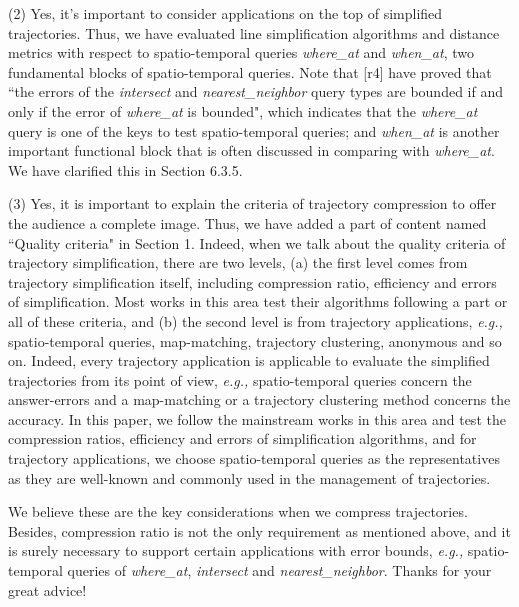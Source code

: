 \documentclass{letter}
\newcommand{\eg}{\emph{e.g.,}\xspace}
\begin{document}
{(2) Yes, it's important to consider applications on the top of simplified trajectories. Thus, we have evaluated line simplification algorithms and distance metrics with respect to spatio-temporal queries \emph{where\_at} and \emph{when\_at}, two fundamental blocks of spatio-temporal queries. Note that [r4] have proved that ``the errors of the \emph{intersect} and \emph{nearest\_neighbor} query types are bounded if and only if the error of \emph{where\_at} is bounded", which indicates that the \emph{where\_at} query is one of the keys to test spatio-temporal queries; and \emph{when\_at} is another important functional block that is often discussed in comparing with \emph{where\_at}.
We have clarified this in Section 6.3.5.

(3) {Yes, it is important to explain the criteria of trajectory compression to offer the audience a complete image.} Thus, we have added a part of content named ``Quality criteria" in Section 1. Indeed, when we talk about the quality criteria of trajectory simplification, there are two levels, 
(a) the first level comes from trajectory simplification itself, including compression ratio, efficiency and errors of simplification. Most works in this area test their algorithms following a part or all of these criteria, and 
(b) the second level is from trajectory applications, \eg spatio-temporal queries, map-matching, trajectory clustering, anonymous and so on. Indeed, every trajectory application is applicable to evaluate the simplified trajectories from its point of view, \eg spatio-temporal queries concern the answer-errors and a map-matching or a trajectory clustering method concerns the accuracy.
%
In this paper, we follow the mainstream works in this area and test the compression ratios, efficiency and errors of simplification algorithms, and for trajectory applications, we choose spatio-temporal queries as the representatives as they are well-known and commonly used in the management of trajectories.

We believe these are the key considerations when we compress trajectories. Besides, compression ratio is not the only requirement as mentioned above, and it is surely necessary to support certain applications with error bounds, \eg spatio-temporal queries of \emph{where\_at}, \emph{intersect} and \emph{nearest\_neighbor}.
Thanks for your great advice!

}
\end{document}
